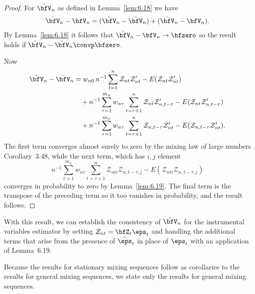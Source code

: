 \begin{proof}
For $\bar{\bfV}_n$ as defined in Lemma~\ref{lem:6.18} we have
\[
  \tilde{\bfV}_n - \bfV_n = (\tilde{\bfV}_n - \bar{\bfV}_n) + (\bar{\bfV}_n - \bfV_n).
\]
By Lemma~\ref{lem:6.18} it follows that $\bar{\bfV}_n - \bfV_n \to \bfzero$ so the result holds if $\tilde{\bfV}_n - \bar{\bfV}_n \convp \bfzero$.

Now
\begin{align*}
  \tilde{\bfV}_n - \bar{\bfV}_n &= w_{n0}\, n^{-1}\sum_{t=1}^{n}\mathcal{Z}_{nt}\mathcal{Z}_{nt}' - E(\mathcal{Z}_{nt}\mathcal{Z}_{nt}') \\
    &\quad + n^{-1}\sum_{\tau=1}^{m_n}w_{n\tau}\sum_{t=\tau+1}^{n}\mathcal{Z}_{nt}\mathcal{Z}_{n,t-\tau}' - E(\mathcal{Z}_{nt}\mathcal{Z}_{n,t-\tau}') \\
    &\quad + n^{-1}\sum_{\tau=1}^{m_n}w_{n\tau}\sum_{t=\tau+1}^{n}\mathcal{Z}_{n,t-\tau}\mathcal{Z}_{nt}' - E(\mathcal{Z}_{n,t-\tau}\mathcal{Z}_{nt}').
\end{align*}
The first term converges almost surely to zero by the mixing law of large numbers Corollary~3.48, while the next term, which has $i,j$ element
\[
  n^{-1}\sum_{\tau=1}^{m_n}w_{n\tau}\sum_{t=\tau+1}^{n}\mathcal{Z}_{nti}\mathcal{Z}_{n,t-\tau,j} - E(\mathcal{Z}_{nti}\mathcal{Z}_{n,t-\tau,j})
\]
converges in probability to zero by Lemma~\ref{lem:6.19}. The final term is the transpose of the preceding term so it too vanishes in probability, and the result follows.
\end{proof}

With this result, we can establish the consistency of $\hat{\bfV}_n$ for the instrumental variables estimator by setting $\mathcal{Z}_{nt} = \bfZ_t\eps_t$ and handling the additional terms that arise from the presence of $\tilde{\eps}_t$ in place of $\eps_t$ with an application of Lemma~6.19.

Because the results for stationary mixing sequences follow as corollaries to the results for general mixing sequences, we state only the results for general mixing sequences.

